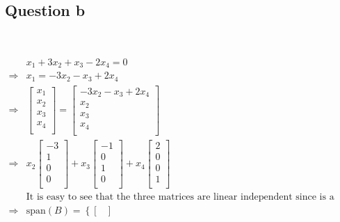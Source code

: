 \documentclass{article}
\begin{document}
\subsection{Question b}

~

\begin{equation*}
    \begin{split}
        &x_1+3x_2+x_3-2x_4=0\\
        \Rightarrow&x_1=-3x_2-x_3+2x_4\\
        \Rightarrow&\begin{bmatrix}
            x_1\\
            x_2\\
            x_3\\
            x_4\\
        \end{bmatrix}=\begin{bmatrix}
            -3x_2-x_3+2x_4\\
            x_2\\
            x_3\\
            x_4\\
        \end{bmatrix}\\
        \Rightarrow&x_2\begin{bmatrix}
            -3\\
            1\\
            0\\
            0\\
        \end{bmatrix}+x_3\begin{bmatrix}
            -1\\
            0\\
            1\\
            0\\
        \end{bmatrix}+x_4\begin{bmatrix}
            2\\
            0\\
            0\\
            1\\
        \end{bmatrix}\\
        &\text{It is easy to see that the three matrices are linear independent since is a unique value in every matrix}\\
        \Rightarrow&\text{span}(B)=\left\{\begin{bmatrix}

\end{bmatrix}
\end{split}
\end{equation*}
\end{document}
